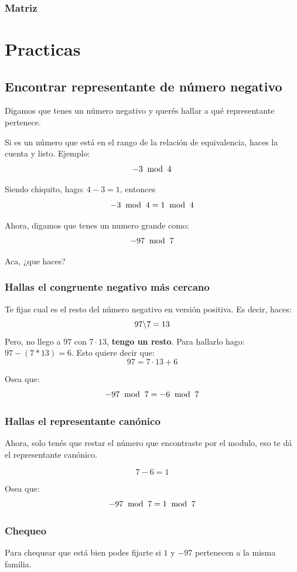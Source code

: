 \documentclass[12pt,a4paper]{report}
\begin{document}
\subsection{Matriz}


\appendix
\chapter{Practicas}

\section{Encontrar representante de número negativo}
Digamos que tenes un número negativo y querés hallar a qué representante pertenece.

Si es un número que está en el rango de la relación de equivalencia, haces la cuenta y listo.
Ejemplo:
$$
-3 \; \bmod \; {{4}} 
$$

Siendo chiquito, hago: $4 - 3 = 1$, entonces
$$
-3 \; \bmod \; {{4}} = 1 \; \bmod \; {{4}} 
$$


Ahora, digamos que tenes un numero grande como:
$$
-97 \; \bmod \; {{7}}
$$

Aca, ¿que haces?

\subsection{Hallas el congruente negativo más cercano}
Te fijas cual es el resto del número negativo en versión positiva. Es decir, haces:
$$
97 \backslash 7 = 13
$$
Pero, no llego a $97$ con $7 \cdot 13$, \textbf{tengo un resto}. Para hallarlo hago: $97 - (7 * 13) = 6$.
Esto quiere decir que:
$$
97 = 7 \cdot 13 + 6
$$

Osea que:
$$
-97 \; \bmod \; {{7}} = -6 \; \bmod \; {{7}}
$$

\subsection{Hallas el representante canónico}
Ahora, solo tenés que restar el número que encontraste por el modulo, eso te dá el representante canónico.

$$
7 - 6 = 1
$$

Osea que:
$$
-97 \; \bmod \; {{7}} = 1 \; \bmod \; {{7}}
$$

\subsection{Chequeo}
Para chequear que está bien podes fijarte si $1$ y $-97$ pertenecen a la misma familia.
\end{document}
